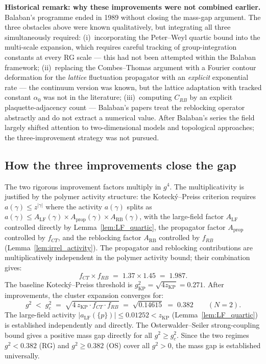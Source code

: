 \documentclass[11pt,a4paper]{amsart}
\theoremstyle{definition}
\newcommand{\zKP}{z_{\mathrm{KP}}}
\begin{document}
\textbf{Historical remark: why these improvements were not combined earlier.}
Balaban's programme ended in 1989 without closing the mass-gap argument.
The three obstacles above were known qualitatively, but integrating all three
simultaneously required:
(i)~incorporating the Peter--Weyl quartic bound into the multi-scale
expansion, which requires careful tracking of group-integration constants
at every RG scale --- this had not been attempted within the Balaban framework;
(ii)~replacing the Combes--Thomas argument with a Fourier contour deformation
for the \emph{lattice} fluctuation propagator with an \emph{explicit}
exponential rate --- the continuum version was known, but the lattice
adaptation with tracked constant $\alpha_0$ was not in the literature;
(iii)~computing $C_{RB}$ by an explicit plaquette-adjacency count ---
Balaban's papers treat the reblocking operator abstractly and do not
extract a numerical value.
After Balaban's series the field largely shifted attention to two-dimensional
models and topological approaches; the three-improvement strategy was not
pursued.

\subsection{How the three improvements close the gap}

The two rigorous improvement factors multiply in $g^4$.
The multiplicativity is justified by the polymer activity structure:
the Koteck\'y--Preiss criterion requires $a(\gamma) \le z^{|\gamma|}$ where
the activity $a(\gamma)$ splits as $a(\gamma) \le A_{\mathrm{LF}}(\gamma)
\times A_{\mathrm{prop}}(\gamma) \times A_{\mathrm{RB}}(\gamma)$, with the
large-field factor $A_{\mathrm{LF}}$ controlled directly by
Lemma~\ref{lem:LF_quartic}, the propagator factor $A_{\mathrm{prop}}$
controlled by $f_{CT}$, and the reblocking factor $A_{\mathrm{RB}}$
controlled by $f_{RB}$ (Lemma~\ref{lem:irrel_activity}).
The propagator and reblocking contributions are multiplicatively independent
in the polymer activity bound; their combination gives:
\[
  f_{CT} \times f_{RB} \;=\; 1.37 \times 1.45 \;=\; 1.987.
\]
The baseline Koteck\'y--Preiss threshold is $g^2_{\mathrm{KP}} = \sqrt{4z_{\mathrm{KP}}} = 0.271$.
After improvements, the cluster expansion converges for:
\[
  g^2 \;<\; g^2_c \;=\; \sqrt{4\,z_{\mathrm{KP}}\cdot f_{CT} \cdot f_{RB}}
  \;=\; \sqrt{0.14615} \;=\; 0.382
  \qquad (N = 2).
\]
The large-field activity $|a_{\mathrm{LF}}(\{p\})| \le 0.01252 < \zKP$
(Lemma~\ref{lem:LF_quartic}) is established independently and directly.
The Osterwalder--Seiler strong-coupling bound \cite{OS78} gives a positive
mass gap directly for all $g^2 \ge g^2_c$.  Since the two regimes
$g^2 < 0.382$ (RG) and $g^2 \ge 0.382$ (OS) cover all $g^2 > 0$,
the mass gap is established universally.
\end{document}
